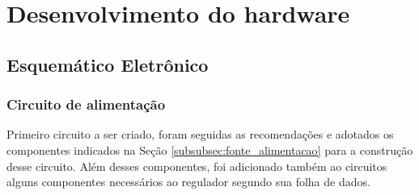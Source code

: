 \section{Desenvolvimento do hardware}

\subsection{Esquemático Eletrônico}

\subsubsection{Circuito de alimentação}

Primeiro circuito a ser criado, foram seguidas as recomendações e adotados os componentes indicados na Seção \ref{subsubsec:fonte_alimentacao} para a construção desse circuito. Além desses componentes, foi adicionado também ao circuitos alguns componentes necessários ao regulador segundo sua folha de dados.


    \begin{figure}[h!]
            \captionsetup{width=10cm}
   \end{figure}    

    \begin{figure}[h!]
        \captionsetup{width=10cm}
\end{figure}    
\newpage

